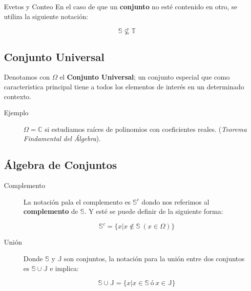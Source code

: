 \documentclass[a4paper]{book}
\begin{document}
\begin{chapter}{Evetos y Conteo}
    En el caso de que un \textbf{conjunto} no esté contenido en otro, se
    utiliza la siguiente notación:

    \begin{equation*}
    \label{eq:1.10}
        \mathbb S\not\subseteq \mathbb T
    \end{equation*}

    \subsection{Conjunto Universal}
    \label{ssec:conjunto_universal}

    Denotamos con $ \Omega $ el \textbf{Conjunto Universal}; un conjunto
    especial que como caracteristica principal tiene a todos los elementos de
    interés en un determinado contexto.

    \begin{description}
        \item[Ejemplo] $\Omega=\mathbb C$ si estudiamos raíces de polinomios
            con coeficientes reales. (\textit{Teorema Findamental del
            Álgebra}).
    \end{description}

    \subsection{Álgebra de Conjuntos}
    \label{ssec:algebra_de_conjuntos}

    \begin{description}
        \item[Complemento] La notación pala el complemento es $\mathbb S^{c}$
            dondo nos referimos al \textbf{complemento} de $\mathbb S$. Y esté
            se puede definir de la siguiente forma:

            \begin{equation*}
            \label{eq:1.11}
                \mathbb S^{c} = \{x|x\not\in \mathbb S\ (x\in \Omega)\}
            \end{equation*}

        \item[Unión] Donde $\mathbb S$ y $\mathbb J$ son conjuntos, la notación
            para la unión entre dos conjuntos es $\mathbb S\cup \mathbb J$ e
            implica:

            \begin{equation*}
            \label{eq:1.12}
                \mathbb S\cup \mathbb J = \{x|x\in \mathbb S\ ó\ x\in \mathbb J\}
            \end{equation*}


\end{description}
\end{chapter}
\end{document}
